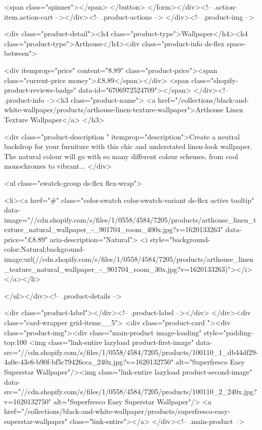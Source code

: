 {{{{{{{              <span class="spinner"></span>
            </button>
          </form></div><!-- .action-item.action-cart --></div><!-- .product-actions -->
</div><!-- .product-img -->

<div class="product-detail"><h4 class="product-type">Wallpaper</h4><h4 class="product-type">Arthouse</h4><div class="product-info ds-flex space-between">
    
<div itemprop="price" content="8.89" class="product-price"><span class="current-price money">£8.89</span></div>
    <span class="shopify-product-reviews-badge" data-id="6706972524709"></span>
  </div><!-- .product-info --><h3 class="product-name">
      <a href="/collections/black-and-white-wallpaper/products/arthouse-linen-texture-wallpaper">Arthouse Linen Texture Wallpaper</a>
    </h3>
    
<div class="product-description " itemprop="description">Create a neutral backdrop for your furniture with this chic and understated linen-look wallpaper. The natural colour will go with so many different colour schemes, from cool monochromes to vibrant...
</div>



<ul class="swatch-group ds-flex flex-wrap">
        
<li><a href="#" class="color-swatch color-swatch-variant ds-flex active tooltip" data-image="//cdn.shopify.com/s/files/1/0558/4584/7205/products/arthouse_linen_texture_natural_wallpaper_-_901704_room_400x.jpg?v=1620133263" data-price="£8.89" aria-description="Natural">
              <i style="background-color:Natural;background-image:url(//cdn.shopify.com/s/files/1/0558/4584/7205/products/arthouse_linen_texture_natural_wallpaper_-_901704_room_30x.jpg?v=1620133263)"></i>
            </a></li>

      </ul></div><!-- .product-details -->

<div class="product-label"></div><!-- .product-label --></div>
          </div><div class="card-wrapper grid-items__5">
            <div class="product-card "><div class="product-img"><div class="main-product image-loading" style="padding-top:100%
      <img class="link-entire lazyload product-first-image" data-src="//cdn.shopify.com/s/files/1/0558/4584/7205/products/100110_1_db44df29-4a0e-43c6-b90f-bf5c79426cca_240x.jpg?v=1620132750" alt="Superfresco Easy Superstar Wallpaper"/><img class="link-entire lazyload product-second-image" data-src="//cdn.shopify.com/s/files/1/0558/4584/7205/products/100110_2_240x.jpg?v=1620132750" alt="Superfresco Easy Superstar Wallpaper"/>
      <a href="/collections/black-and-white-wallpaper/products/superfresco-easy-superstar-wallpaper" class="link-entire"></a>
    </div><!-- .main-product -->
  
}}}}}}}
